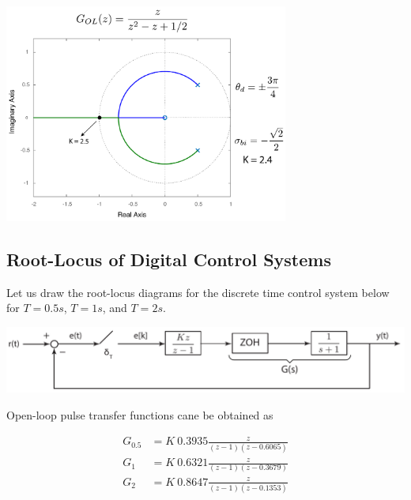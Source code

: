 \documentclass[twoside]{article}
\begin{document}
\begin{center}
\begin{minipage}[h]{\linewidth}
    \begin{center}
      \includegraphics[width=0.7\textwidth]{E5}
    \end{center}
\end{minipage}
    \end{center}

\newpage

\subsection*{Root-Locus of Digital Control Systems}

Let us draw the root-locus diagrams for the discrete time control
system below for $T = 0.5 s$, $T = 1 s$, and $T = 2 s$. 

\begin{center}
\begin{minipage}[h]{\linewidth}
    \begin{center}
      \includegraphics[width=\textwidth]{digitalblock}
    \end{center}
\end{minipage}
\end{center}

Open-loop pulse transfer functions cane be obtained as

\begin{align*}
G_{0.5} &= K \ 0.3935 \frac{z}{(z-1) (z - 0.6065)}
\\
G_{1} &= K \ 0.6321 \frac{z}{(z-1) (z - 0.3679)}
\\
G_{2} &= K \ 0.8647 \frac{z}{(z-1) (z - 0.1353)}
\end{align*}
\end{document}
